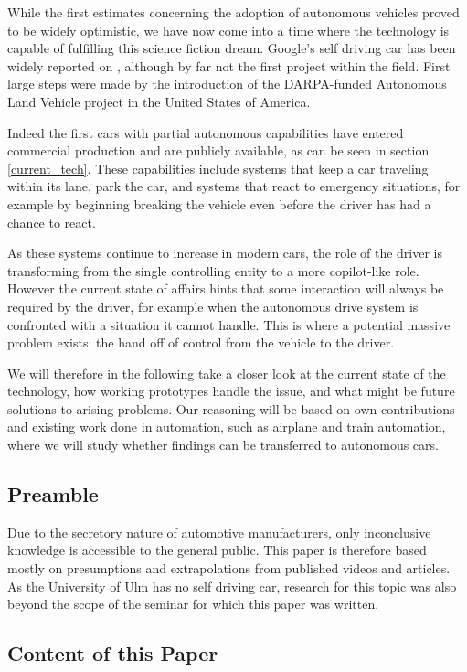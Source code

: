 \documentclass{acm_proc_article-sp}
\begin{document}
While the first estimates concerning the adoption of autonomous vehicles proved to be widely optimistic, we have now come into a time where the technology is capable of fulfilling this science fiction dream.
Google's self driving car has been widely reported on \cite{www:newyorker_google_car}, although by far not the first project within the field.
First large steps were made by the introduction of the DARPA-funded Autonomous Land Vehicle project in the United States of America.

Indeed the first cars with partial autonomous capabilities have entered commercial production and are publicly available, as can be seen in section \ref{current_tech}.
These capabilities include systems that keep a car traveling within its lane, park the car, and systems that react to emergency situations, for example by beginning breaking the vehicle even before the driver has had a chance to react.

As these systems continue to increase in modern cars, the role of the driver is transforming from the single controlling entity to a more copilot-like role.
However the current state of affairs hints that some interaction will always be required by the driver, for example when the autonomous drive system is confronted with a situation it cannot handle.
This is where a potential massive problem exists: the hand off of control from the vehicle to the driver.

We will therefore in the following take a closer look at the current state of the technology, how working prototypes handle the issue, and what might be future solutions to arising problems.
Our reasoning will be based on own contributions and existing work done in automation, such as airplane and train automation, where we will study whether findings can be transferred to autonomous cars.

\subsection{Preamble}

Due to the secretory nature of automotive manufacturers, only inconclusive knowledge is accessible to the general public.
This paper is therefore based mostly on presumptions and extrapolations from published videos and articles.
As the University of Ulm has no self driving car, research for this topic was also beyond the scope of the seminar for which this paper was written.

\subsection{Content of this Paper}
\end{document}
